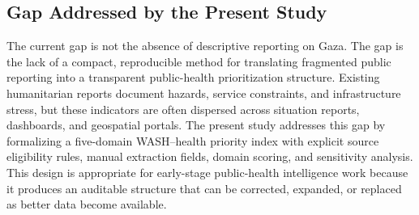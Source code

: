 \subsection{Gap Addressed by the Present Study}

The current gap is not the absence of descriptive reporting on Gaza. The gap is the lack of a compact, reproducible method for translating fragmented public reporting into a transparent public-health prioritization structure. Existing humanitarian reports document hazards, service constraints, and infrastructure stress, but these indicators are often dispersed across situation reports, dashboards, and geospatial portals. The present study addresses this gap by formalizing a five-domain WASH--health priority index with explicit source eligibility rules, manual extraction fields, domain scoring, and sensitivity analysis. This design is appropriate for early-stage public-health intelligence work because it produces an auditable structure that can be corrected, expanded, or replaced as better data become available.
